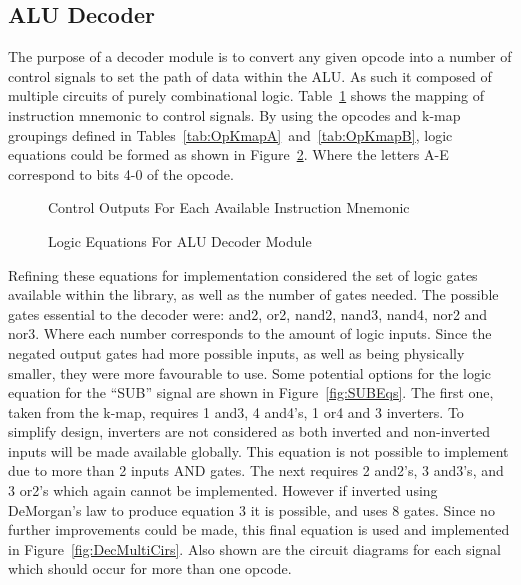 \subsection{ALU Decoder}
The purpose of a decoder module is to convert any given opcode into a number of control signals to set the path of data within the ALU. As such it composed of multiple circuits of purely combinational logic. Table~\ref{tab:contrOuts} shows the mapping of instruction mnemonic to control signals. By using the opcodes and k-map groupings defined in Tables~\ref{tab:OpKmapA}~and~\ref{tab:OpKmapB}, logic equations could be formed as shown in Figure~\ref{fig:ALUDEq}. Where the letters A-E correspond to bits 4-0 of the opcode. 

\begin{figure}[h]
	\caption{Control Outputs For Each Available Instruction Mnemonic}
	\label{tab:contrOuts}
\end{figure}

\begin{figure}[h]
	\caption{Logic Equations For ALU Decoder Module}
	\label{fig:ALUDEq}
\end{figure}

Refining these equations for implementation considered the set of logic gates available within the library, as well as the number of gates needed. The possible gates essential to the decoder were: and2, or2, nand2, nand3, nand4, nor2 and nor3. Where each number corresponds to the amount of logic inputs. Since the negated output gates had more possible inputs, as well as being physically smaller, they were more favourable to use. Some potential options for the logic equation for the ``SUB'' signal are shown in Figure~\ref{fig:SUBEqs}. The first one, taken from the k-map, requires 1 and3, 4 and4's, 1 or4 and 3 inverters. To simplify design, inverters are not considered as both inverted and non-inverted inputs will be made available globally. This equation is not possible to implement due to more than 2 inputs AND gates. The next requires 2 and2's, 3 and3's, and 3 or2's which again cannot be implemented. However if inverted using DeMorgan's law to produce equation 3 it is possible, and uses 8 gates. Since no further improvements could be made, this final equation is used and implemented in Figure~\ref{fig:DecMultiCirs}. Also shown are the circuit diagrams for each signal which should occur for more than one opcode. 

